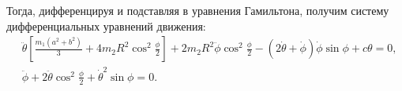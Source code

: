     Тогда, дифференцируя и подставляя в уравнения Гамильтона, получим систему
    дифференциальных уравнений движения:
    \begin{align*}
        & \ddot{\theta}\left[\frac{m_1(a^2 + b^2)}{3} + 4m_2R^2
        \cos^2\frac{\phi}{2}\right] + 2m_2R^2\ddot{\phi}\cos^2\frac{\phi}{2} -
        (2\dot{\theta} + \dot{\phi})\dot{\phi}\sin\phi + c\theta = 0, \\
        & \ddot{\phi} + 2\ddot{\theta}\cos^2\frac{\phi}{2} + \dot{\theta}^2
        \sin\phi = 0.
    \end{align*}
